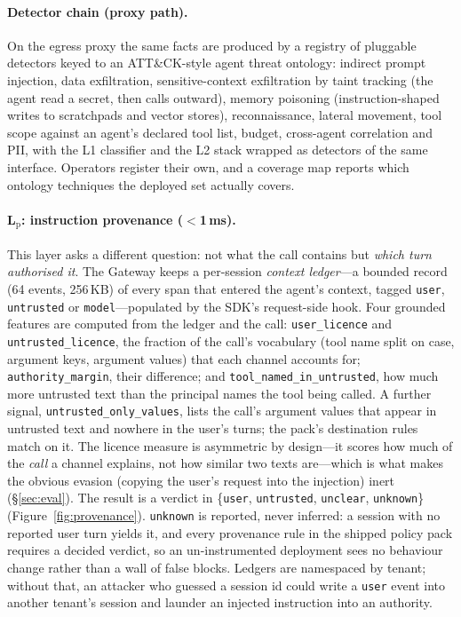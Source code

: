 \documentclass[sigconf,nonacm]{acmart}
\begin{document}
\paragraph{Detector chain (proxy path).}
On the egress proxy the same facts are produced by a registry of
pluggable detectors keyed to an ATT\&CK-style agent threat ontology:
indirect prompt injection, data exfiltration, sensitive-context
exfiltration by taint tracking (the agent read a secret, then calls
outward), memory poisoning (instruction-shaped writes to scratchpads and
vector stores), reconnaissance, lateral movement, tool scope against an
agent's declared tool list, budget, cross-agent correlation and PII, with
the L1 classifier and the L2 stack wrapped as detectors of the same
interface. Operators register their own, and a coverage map reports
which ontology techniques the deployed set actually covers.

\paragraph{L$_\mathrm{p}$: instruction provenance ($<$1\,ms).}
\label{sec:provenance}
This layer asks a different question: not what the call contains but
\emph{which turn authorised it}. The Gateway keeps a per-session
\emph{context ledger}---a bounded record (64 events, 256\,KB) of every
span that entered the agent's context, tagged \texttt{user},
\texttt{untrusted} or \texttt{model}---populated by the SDK's
request-side hook. Four grounded features are computed from the ledger
and the call: \texttt{user\_licence} and \texttt{untrusted\_licence},
the fraction of the call's vocabulary (tool name split on case, argument
keys, argument values) that each channel accounts for;
\texttt{authority\_margin}, their difference; and
\texttt{tool\_named\_in\_untrusted}, how much more untrusted text than
the principal names the tool being called. A further signal, \texttt{untrusted\_only\_values}, lists the call's argument values that appear in untrusted text and nowhere in the user's turns; the pack's destination rules match on it. The licence measure is
asymmetric by design---it scores how much of the \emph{call} a channel
explains, not how similar two texts are---which is what makes the
obvious evasion (copying the user's request into the injection) inert
(\S\ref{sec:eval}). The result is a verdict in
\{\texttt{user}, \texttt{untrusted}, \texttt{unclear}, \texttt{unknown}\}
(Figure~\ref{fig:provenance}).
\texttt{unknown} is reported, never inferred: a session with no reported
user turn yields it, and every provenance rule in the shipped policy pack
requires a decided verdict, so an un-instrumented deployment sees no
behaviour change rather than a wall of false blocks. Ledgers are
namespaced by tenant; without that, an attacker who guessed a session id
could write a \texttt{user} event into another tenant's session and
launder an injected instruction into an authority.
\end{document}
